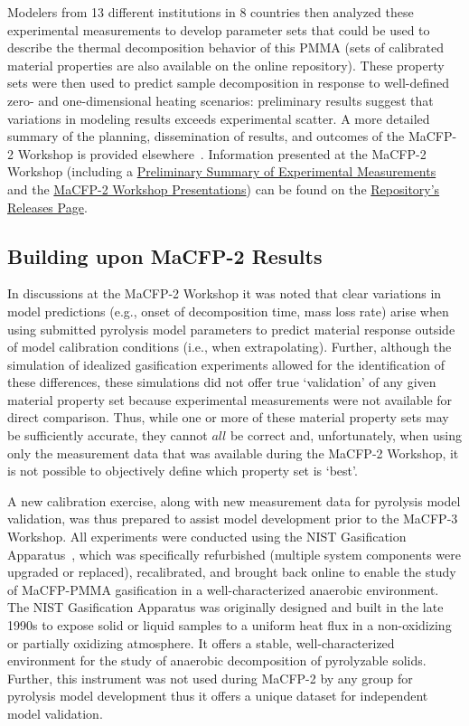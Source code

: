 \documentclass[12pt]{article}
\begin{document}
Modelers from 13 different institutions in 8 countries then analyzed these experimental measurements to develop parameter sets that could be used to describe the thermal decomposition behavior of this PMMA (sets of calibrated material properties are also available on the online repository). These property sets were then used to predict sample decomposition in response to well-defined zero- and one-dimensional heating scenarios: preliminary results suggest that variations in modeling results exceeds experimental scatter.  A more detailed summary of the planning, dissemination of results, and outcomes of the MaCFP-2 Workshop is provided elsewhere~\cite{Leventon2022ASTM}. Information presented at the MaCFP-2 Workshop (including a \href{https://github.com/MaCFP/matl-db/releases/tag/v1.0.0}{Preliminary Summary of Experimental Measurements}~\cite{PreliminarySummary} and the \href{https://github.com/MaCFP/matl-db/releases/tag/v1.1.0}{MaCFP-2 Workshop Presentations}) can be found on the \href{https://github.com/MaCFP/matl-db/releases}{Repository's Releases Page}.

\subsection{Building upon MaCFP-2 Results}
In discussions at the MaCFP-2 Workshop it was noted that clear variations in model predictions (e.g., onset of decomposition time, mass loss rate) arise when using submitted pyrolysis model parameters to predict material response outside of model calibration conditions (i.e., when extrapolating). Further, although the simulation of idealized gasification experiments allowed for the identification of these differences, these simulations did not offer true `validation' of any given material property set because experimental measurements were not available for direct comparison. Thus, while one or more of these material property sets may be sufficiently accurate, they cannot $all$ be correct and, unfortunately, when using only the measurement data that was available during the MaCFP-2 Workshop, it is not possible to objectively define which property set is `best'.

A new calibration exercise, along with new measurement data for pyrolysis model validation, was thus prepared to assist model development prior to the MaCFP-3 Workshop. All experiments were conducted using the NIST Gasification Apparatus~\cite{austin1998gasification}, which was specifically refurbished (multiple system components were upgraded or replaced), recalibrated, and brought back online to enable the study of MaCFP-PMMA gasification in a well-characterized anaerobic environment. The NIST Gasification Apparatus was originally designed and built in the late 1990s to expose solid or liquid samples to a uniform heat flux in a non-oxidizing or partially oxidizing atmosphere. It offers a stable, well-characterized environment for the study of anaerobic decomposition of pyrolyzable solids. Further, this instrument was not used during MaCFP-2 by any group for pyrolysis model development thus it offers a unique dataset for independent model validation.
\end{document}
